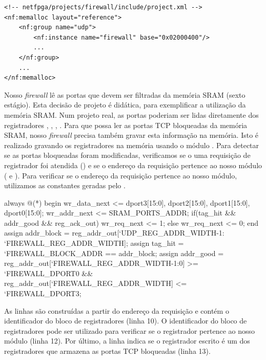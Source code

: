 \begin{verbatim}
<!-- netfpga/projects/firewall/include/project.xml -->
<nf:memalloc layout="reference">
    <nf:group name="udp">
        <nf:instance name="firewall" base="0x02000400"/>
        ...
    </nf:group>
    ...
</nf:memalloc>
\end{verbatim}

Nosso \emph{firewall} lê as portas que devem ser filtradas da memória
SRAM (sexto estágio).  Esta decisão de projeto é didática, para
exemplificar a utilização da memória SRAM.  Num projeto real, as portas
poderiam ser lidas diretamente dos registradores ,
, , .  Para que possa ler as portas
TCP bloqueadas da memória SRAM, nosso \emph{firewall} precisa também
gravar esta informação na memória.  Isto é realizado gravando os
registradores na memória usando o módulo .  Para
detectar se as portas bloqueadas foram modificadas, verificamos se o uma
requisição de registrador foi atendida () e se o
endereço da requisição pertence ao nosso módulo ( e
).  Para verificar se o endereço da requisição pertence
ao nosso módulo, utilizamos as constantes geradas pelo
.

\begin{verilogcode}
   always @(*) begin
      wr_data_next <= {dport3[15:0], dport2[15:0],
                       dport1[15:0], dport0[15:0]};
      wr_addr_next <= SRAM_PORTS_ADDR;
      if(tag_hit && addr_good && reg_ack_out)
         wr_req_next <= 1;
      else
         wr_req_next <= 0;
   end
   assign addr_block = reg_addr_out[`UDP_REG_ADDR_WIDTH-1:
                                    `FIREWALL_REG_ADDR_WIDTH];
   assign tag_hit = `FIREWALL_BLOCK_ADDR == addr_block;
   assign addr_good = reg_addr_out[`FIREWALL_REG_ADDR_WIDTH-1:0] >= 
    `FIREWALL_DPORT0 && reg_addr_out[`FIREWALL_REG_ADDR_WIDTH] <= 
    `FIREWALL_DPORT3;
\end{verilogcode}

As linhas  são construídas a partir do endereço da
requisição e contém o identificador do bloco de registradores (linha
10).  O identificador do bloco de registradores pode ser utilizado para
verificar se o registrador pertence ao nosso módulo (linha 12).  Por
último, a linha  indica se o registrador escrito é um
dos registradores que armazena as portas TCP bloqueadas (linha 13).
